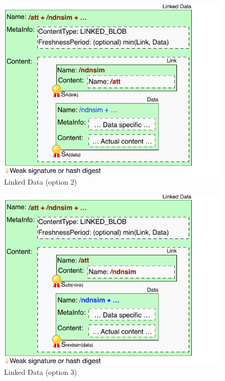 \documentclass[10pt]{article}
\begin{document}
\begin{figure}[h]
  \centering
  \includegraphics[scale=0.8]{linked-data2}
  \caption{Linked Data (option 2)}
  \label{fig:linked-dat}
\end{figure}

\begin{figure}[h]
  \centering
  \includegraphics[scale=0.8]{linked-data3}
  \caption{Linked Data (option 3)}
  \label{fig:linked-dat}
\end{figure}
\end{document}
